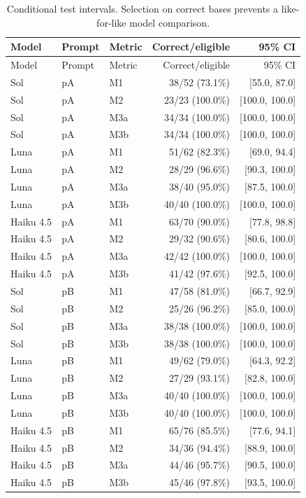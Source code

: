 \begingroup\small\setlength{\tabcolsep}{4pt}
\begin{longtable}{lllrr}
\caption{Conditional test intervals. Selection on correct bases prevents a like-for-like model comparison.}\\
\toprule
Model & Prompt & Metric & Correct/eligible & 95\% CI \\
\midrule\endfirsthead
\toprule
Model & Prompt & Metric & Correct/eligible & 95\% CI \\
\midrule\endhead
\bottomrule\endfoot
Sol & pA & M1 & 38/52 (73.1\%) & [55.0, 87.0] \\
Sol & pA & M2 & 23/23 (100.0\%) & [100.0, 100.0] \\
Sol & pA & M3a & 34/34 (100.0\%) & [100.0, 100.0] \\
Sol & pA & M3b & 34/34 (100.0\%) & [100.0, 100.0] \\
Luna & pA & M1 & 51/62 (82.3\%) & [69.0, 94.4] \\
Luna & pA & M2 & 28/29 (96.6\%) & [90.3, 100.0] \\
Luna & pA & M3a & 38/40 (95.0\%) & [87.5, 100.0] \\
Luna & pA & M3b & 40/40 (100.0\%) & [100.0, 100.0] \\
Haiku 4.5 & pA & M1 & 63/70 (90.0\%) & [77.8, 98.8] \\
Haiku 4.5 & pA & M2 & 29/32 (90.6\%) & [80.6, 100.0] \\
Haiku 4.5 & pA & M3a & 42/42 (100.0\%) & [100.0, 100.0] \\
Haiku 4.5 & pA & M3b & 41/42 (97.6\%) & [92.5, 100.0] \\
Sol & pB & M1 & 47/58 (81.0\%) & [66.7, 92.9] \\
Sol & pB & M2 & 25/26 (96.2\%) & [85.0, 100.0] \\
Sol & pB & M3a & 38/38 (100.0\%) & [100.0, 100.0] \\
Sol & pB & M3b & 38/38 (100.0\%) & [100.0, 100.0] \\
Luna & pB & M1 & 49/62 (79.0\%) & [64.3, 92.2] \\
Luna & pB & M2 & 27/29 (93.1\%) & [82.8, 100.0] \\
Luna & pB & M3a & 40/40 (100.0\%) & [100.0, 100.0] \\
Luna & pB & M3b & 40/40 (100.0\%) & [100.0, 100.0] \\
Haiku 4.5 & pB & M1 & 65/76 (85.5\%) & [77.6, 94.1] \\
Haiku 4.5 & pB & M2 & 34/36 (94.4\%) & [88.9, 100.0] \\
Haiku 4.5 & pB & M3a & 44/46 (95.7\%) & [90.5, 100.0] \\
Haiku 4.5 & pB & M3b & 45/46 (97.8\%) & [93.5, 100.0] \\
\end{longtable}\endgroup


